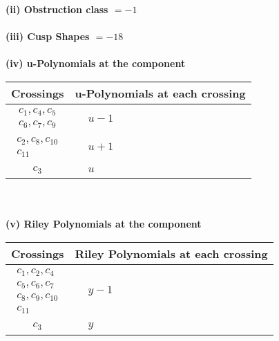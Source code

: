 \documentclass[1p]{elsarticle_modified}
\theoremstyle{definition}
\begin{document}
\flushleft \textbf{(ii) Obstruction class $= -1$}\\~\\
\flushleft \textbf{(iii) Cusp Shapes $= -18$}\\~\\
\newpage\renewcommand{\arraystretch}{1}
\flushleft \textbf{(iv) u-Polynomials at the component}\newline \\
\begin{tabular}{m{50pt}|m{274pt}}
Crossings & \hspace{64pt}u-Polynomials at each crossing \\
\hline $$\begin{aligned}c_{1},c_{4},c_{5}\\c_{6},c_{7},c_{9}\end{aligned}$$&$\begin{aligned}
&u-1
\end{aligned}$\\
\hline $$\begin{aligned}c_{2},c_{8},c_{10}\\c_{11}\end{aligned}$$&$\begin{aligned}
&u+1
\end{aligned}$\\
\hline $$\begin{aligned}c_{3}\end{aligned}$$&$\begin{aligned}
&u
\end{aligned}$\\
\hline
\end{tabular}\\~\\
\newpage\renewcommand{\arraystretch}{1}
\flushleft \textbf{(v) Riley Polynomials at the component}\newline \\
\begin{tabular}{m{50pt}|m{274pt}}
Crossings & \hspace{64pt}Riley Polynomials at each crossing \\
\hline $$\begin{aligned}c_{1},c_{2},c_{4}\\c_{5},c_{6},c_{7}\\c_{8},c_{9},c_{10}\\c_{11}\end{aligned}$$&$\begin{aligned}
&y-1
\end{aligned}$\\
\hline $$\begin{aligned}c_{3}\end{aligned}$$&$\begin{aligned}
&y
\end{aligned}$\\
\hline
\end{tabular}\\~\\
\end{document}
